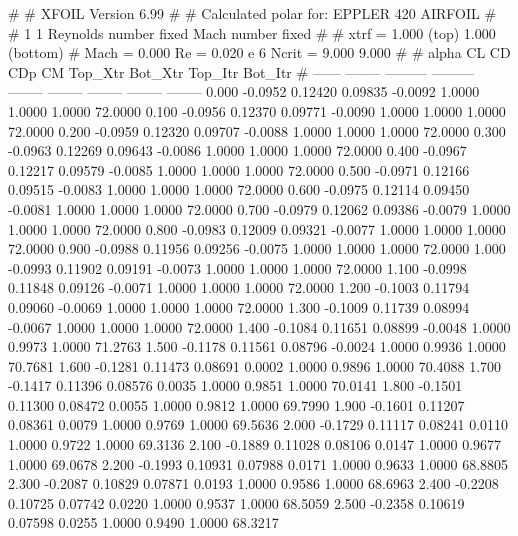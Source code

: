 #  
#       XFOIL         Version 6.99
#  
# Calculated polar for: EPPLER 420 AIRFOIL                              
#  
# 1 1 Reynolds number fixed          Mach number fixed         
#  
# xtrf =   1.000 (top)        1.000 (bottom)  
# Mach =   0.000     Re =     0.020 e 6     Ncrit =   9.000  9.000
#  
#   alpha    CL        CD       CDp       CM     Top_Xtr  Bot_Xtr  Top_Itr  Bot_Itr
#  ------ -------- --------- --------- -------- -------- -------- -------- --------
   0.000  -0.0952   0.12420   0.09835  -0.0092   1.0000   1.0000   1.0000  72.0000
   0.100  -0.0956   0.12370   0.09771  -0.0090   1.0000   1.0000   1.0000  72.0000
   0.200  -0.0959   0.12320   0.09707  -0.0088   1.0000   1.0000   1.0000  72.0000
   0.300  -0.0963   0.12269   0.09643  -0.0086   1.0000   1.0000   1.0000  72.0000
   0.400  -0.0967   0.12217   0.09579  -0.0085   1.0000   1.0000   1.0000  72.0000
   0.500  -0.0971   0.12166   0.09515  -0.0083   1.0000   1.0000   1.0000  72.0000
   0.600  -0.0975   0.12114   0.09450  -0.0081   1.0000   1.0000   1.0000  72.0000
   0.700  -0.0979   0.12062   0.09386  -0.0079   1.0000   1.0000   1.0000  72.0000
   0.800  -0.0983   0.12009   0.09321  -0.0077   1.0000   1.0000   1.0000  72.0000
   0.900  -0.0988   0.11956   0.09256  -0.0075   1.0000   1.0000   1.0000  72.0000
   1.000  -0.0993   0.11902   0.09191  -0.0073   1.0000   1.0000   1.0000  72.0000
   1.100  -0.0998   0.11848   0.09126  -0.0071   1.0000   1.0000   1.0000  72.0000
   1.200  -0.1003   0.11794   0.09060  -0.0069   1.0000   1.0000   1.0000  72.0000
   1.300  -0.1009   0.11739   0.08994  -0.0067   1.0000   1.0000   1.0000  72.0000
   1.400  -0.1084   0.11651   0.08899  -0.0048   1.0000   0.9973   1.0000  71.2763
   1.500  -0.1178   0.11561   0.08796  -0.0024   1.0000   0.9936   1.0000  70.7681
   1.600  -0.1281   0.11473   0.08691   0.0002   1.0000   0.9896   1.0000  70.4088
   1.700  -0.1417   0.11396   0.08576   0.0035   1.0000   0.9851   1.0000  70.0141
   1.800  -0.1501   0.11300   0.08472   0.0055   1.0000   0.9812   1.0000  69.7990
   1.900  -0.1601   0.11207   0.08361   0.0079   1.0000   0.9769   1.0000  69.5636
   2.000  -0.1729   0.11117   0.08241   0.0110   1.0000   0.9722   1.0000  69.3136
   2.100  -0.1889   0.11028   0.08106   0.0147   1.0000   0.9677   1.0000  69.0678
   2.200  -0.1993   0.10931   0.07988   0.0171   1.0000   0.9633   1.0000  68.8805
   2.300  -0.2087   0.10829   0.07871   0.0193   1.0000   0.9586   1.0000  68.6963
   2.400  -0.2208   0.10725   0.07742   0.0220   1.0000   0.9537   1.0000  68.5059
   2.500  -0.2358   0.10619   0.07598   0.0255   1.0000   0.9490   1.0000  68.3217
